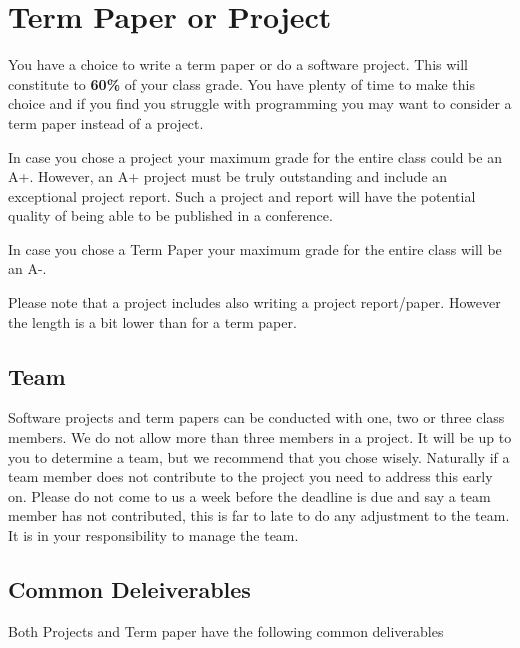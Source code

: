 \FILENAME

\section{Term Paper or Project}\label{term-paper-or-project}

You have a choice to write a term paper or do a software project. This
will constitute to \textbf{60\%} of your class grade. You have plenty of
time to make this choice and if you find you struggle with programming
you may want to consider a term paper instead of a project.

In case you chose a project your maximum grade for the entire class
could be an A+. However, an A+ project must be truly outstanding and
include an exceptional project report. Such a project and report will
have the potential quality of being able to be published in a
conference.

In case you chose a Term Paper your maximum grade for the entire class
will be an A-.

Please note that a project includes also writing a project report/paper.
However the length is a bit lower than for a term paper.

\subsection{Team}\label{team}

Software projects and term papers can be conducted with one, two or
three class members. We do not allow more than three members in a
project. It will be up to you to determine a team, but we recommend that
you chose wisely. Naturally if a team member does not contribute to the
project you need to address this early on. Please do not come to us a
week before the deadline is due and say a team member has not
contributed, this is far to late to do any adjustment to the team. It is
in your responsibility to manage the team.

\subsection{Common Deleiverables}\label{common-deleiverables}

Both Projects and Term paper have the following common deliverables

